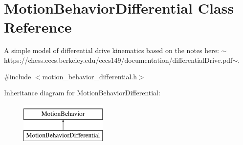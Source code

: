 \hypertarget{class_motion_behavior_differential}{}\section{Motion\+Behavior\+Differential Class Reference}
\label{class_motion_behavior_differential}


A simple model of differential drive kinematics based on the notes here\+: $\sim$https\+://chess.eecs.\+berkeley.\+edu/eecs149/documentation/differential\+Drive.pdf$\sim$.  




{\ttfamily \#include $<$motion\+\_\+behavior\+\_\+differential.\+h$>$}

Inheritance diagram for Motion\+Behavior\+Differential\+:\begin{figure}[H]
\begin{center}
\leavevmode
\includegraphics[height=2.000000cm]{class_motion_behavior_differential}
\end{center}
\end{figure}

